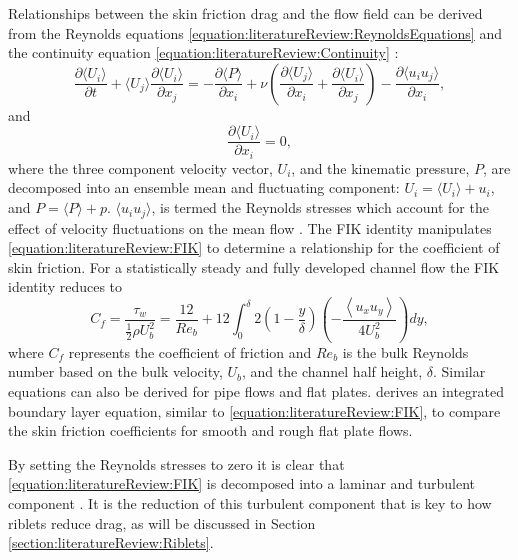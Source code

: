 \documentclass[12pt,oneside,a4paper]{article}
\newcommand{\pdev}[2]{\frac{\partial {#1}}{\partial {#2}}}
\begin{document}
Relationships between the skin friction drag and the flow field can be derived from the Reynolds equations \eqref{equation:literatureReview:ReynoldsEquations} and the continuity equation \eqref{equation:literatureReview:Continuity} \citep{pope2001}:
\begin{equation}
\pdev{\langle U_i \rangle}{t} + \langle U_j \rangle \pdev{\langle U_i \rangle}{x_j}
=
-\pdev{\langle P \rangle}{x_i}
+
\nu
	\left(
	\pdev{\langle U_j \rangle}{x_i}
	+
	\pdev{\langle U_i \rangle}{x_j} 
	\right)
-
\pdev{\langle u_i u_j\rangle}{x_i},
\label{equation:literatureReview:ReynoldsEquations}
\end{equation}
and 
\begin{equation}
\pdev{\langle U_i \rangle}{x_i}
=
0,
\label{equation:literatureReview:Continuity}
\end{equation}
where the three component velocity vector, $U_i$, and the kinematic pressure, $P$, are decomposed into an ensemble mean and fluctuating component: $U_i = \langle U_i \rangle + u_i$, and $P = \langle P \rangle + p$. $\langle u_i u_j \rangle$, is termed the Reynolds stresses which account for the effect of velocity fluctuations on the mean flow \citep{pope2001}. The FIK identity \citep{fukagata2002} manipulates \eqref{equation:literatureReview:FIK} to determine a relationship for the coefficient of skin friction. For a statistically steady and fully developed channel flow the FIK identity reduces to
\begin{equation}
\label{equation:literatureReview:FIK}
C_f = \frac{\tau_w}{\frac{1}{2} \rho U_b^2} = \frac{12}{Re_b} + 12 \int_0^\delta 2 \left(1 - \frac{y}{\delta} \right)\left( - \frac{\left< u_x u_y \right> }{4 U_b^2} \right) dy,
\end{equation}
where $C_f$ represents the coefficient of friction and $Re_b$ is the bulk Reynolds number based on the bulk velocity, $U_b$, and the channel half height, $\delta$. Similar equations can also be derived for pipe flows and flat plates. \cite{newhall2006} derives an integrated boundary layer equation, similar to \eqref{equation:literatureReview:FIK}, to compare the skin friction coefficients for smooth and rough flat plate flows. 

By setting the Reynolds stresses to zero it is clear that \eqref{equation:literatureReview:FIK} is decomposed into a laminar and turbulent component \citep{kasagi2006}. It is the reduction of this turbulent component that is key to how riblets reduce drag, as will be discussed in Section \ref{section:literatureReview:Riblets}.
\end{document}
